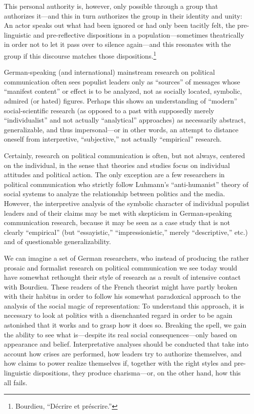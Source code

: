 \documentclass{tufte-handout}
\begin{document}
This personal authority is, however, only possible through a group that
authorizes it---and this in turn authorizes the group in their identity
and unity: An actor speaks out what had been ignored or had only been
tacitly felt, the pre-linguistic and pre-reflective dispositions in a
population---sometimes theatrically in order not to let it pass over to
silence again---and this resonates with the group if this discourse
matches those dispositions.\footnote{Bourdieu, ``Décrire et préscrire.''}

German-speaking (and international) mainstream research on political
communication often sees populist leaders only as ``sources'' of
messages whose ``manifest content'' or effect is to be analyzed, not as
socially located, symbolic, admired (or hated) figures. Perhaps this
shows an understanding of ``modern'' social-scientific research (as
opposed to a past with supposedly merely ``individualist'' and not
actually ``analytical'' approaches) as necessarily abstract,
generalizable, and thus impersonal---or in other words, an attempt to
distance oneself from interpretive, ``subjective,'' not actually
``empirical'' research.

Certainly, research on political communication is often, but not always,
centered on the individual, in the sense that theories and studies focus
on individual attitudes and political action. The only exception are a
few researchers in political communication who strictly follow Luhmann's
``anti-humanist'' theory of social systems to analyze the relationship
between politics and the media. However, the interpretive analysis of
the symbolic character of individual populist leaders and of their
claims may be met with skepticism in German-speaking communication
research, because it may be seen as a case study that is not clearly
``empirical'' (but ``essayistic,'' ``impressionistic,'' merely
``descriptive,'' etc.) and of questionable generalizability.

We can imagine a set of German researchers, who instead of producing the
rather prosaic and formalist research on political communication we see
today would have somewhat rethought their style of research as a result
of intensive contact with Bourdieu. These readers of the French theorist
might have partly broken with their habitus in order to follow his
somewhat paradoxical approach to the analysis of the social magic of
representation: To understand this approach, it is necessary to look at
politics with a disenchanted regard in order to be again astonished that
it works and to grasp how it does so. Breaking the spell, we gain the
ability to see what is---despite its real social consequences---only
based on appearance and belief. Interpretative analyses should be
conducted that take into account how crises are performed, how leaders
try to authorize themselves, and how claims to power realize themselves
if, together with the right styles and pre-linguistic dispositions, they
produce charisma---or, on the other hand, how this all fails.
\end{document}
